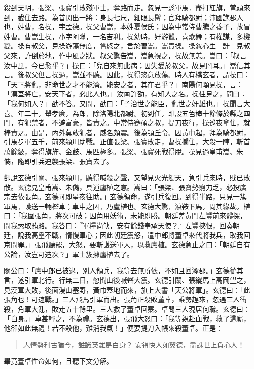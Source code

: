 殺到天明，張梁、張寶引敗殘軍士，奪路而走。忽見一彪軍馬，盡打紅旗，當頭來到，截住去路。為首閃出一將：身長七尺，細眼長髯；官拜騎都尉；沛國譙郡人也，姓曹，名操，字孟德。操父曹嵩，本姓夏侯氏；因為中常侍曹騰之養子，故冒姓曹。曹嵩生操，小字阿瞞，一名吉利。操幼時，好游獵，喜歌舞；有權謀，多機變。操有叔父，見操游蕩無度，嘗怒之，言於曹嵩。嵩責操。操忽心生一計：見叔父來，詐倒於地，作中風之狀。叔父驚告嵩，嵩急視之，操故無恙。嵩曰：「叔言汝中風，今已愈乎？」操曰：「兒自來無此病；因失愛於叔父，故見罔耳。」嵩信其言。後叔父但言操過，嵩並不聽。因此，操得恣意放蕩。時人有橋玄者，謂操曰：「天下將亂，非命世之才不能濟。能安之者，其在君乎？」南陽何顒見操，言：「漢室將亡，安天下者，必此人也。」汝南許劭，有知人之名。操往見之，問曰：「我何如人？」劭不答。又問，劭曰：「子治世之能臣，亂世之奸雄也。」操聞言大喜。年二十，舉孝廉，為郎，除洛陽北都尉。初到任，即設五色棒十餘條於縣之四門，有犯禁者，不避富豪，皆責之。中常侍蹇碩之叔，提刀夜行，操巡夜拿住，就棒責之。由是，內外莫敢犯者，威名頗震。後為頓丘令。因黃巾起，拜為騎都尉，引馬步軍五千，前來潁川助戰。正值張梁、張寶敗走，曹操攔住，大殺一陣，斬首萬餘級，奪得旗旌、金鼓、馬匹極多。張梁、張寶死戰得脫。操見過皇甫嵩、朱儁，隨即引兵追襲張梁、張寶去了。

卻說玄德引關、張來潁川，聽得喊殺之聲，又望見火光燭天，急引兵來時，賊已敗散。玄德見皇甫嵩、朱儁，具道盧植之意。嵩曰：「張梁、張寶勢窮力乏，必投廣宗去依張角。玄德可即星夜往助。」玄德領命，遂引兵復回。到得半路，只見一簇軍馬，護送一輛檻車；車中之囚，乃盧植也。玄德大驚，滾鞍下馬，問其緣故。植曰：「我圍張角，將次可破；因角用妖術，未能即勝。朝廷差黃門左豐前來體探，問我索取賄賂。我答曰：『軍糧尚缺，安有餘錢奉承天使？』左豐挾恨，回奏朝廷，說我高壘不戰，惰慢軍心；因此朝廷震怒，遣中郎將董卓來代將我兵，取我回京問罪。」張飛聽罷，大怒，要斬護送軍人，以救盧植。玄德急止之曰：「朝廷自有公論，汝豈可造次？」軍士簇擁盧植去了。

關公曰：「盧中郎已被逮，別人領兵，我等去無所依，不如且回涿郡。」玄德從其言，遂引軍北行。行無二日，忽聞山後喊聲大震。玄德引關、張縱馬上高岡望之，見漢軍大敗，後面漫山塞野，黃巾蓋地而來，旗上大書「天公將軍」。玄德曰：「此張角也！可速戰。」三人飛馬引軍而出。張角正殺敗董卓，乘勢趕來，忽遇三人衝殺，角軍大亂，敗走五十餘里。三人救了董卓回寨。卓問三人現居何職。玄德曰：「白身。」卓甚輕之，不為禮。玄德出，張飛大怒曰：「我等親赴血戰，救了這廝，他卻如此無禮！若不殺他，難消我氣！」便要提刀入帳來殺董卓。正是：

\begin{quote}
人情勢利古猶今，誰識英雄是白身？
安得快人如翼德，盡誅世上負心人！
\end{quote}

畢竟董卓性命如何，且聽下文分解。
